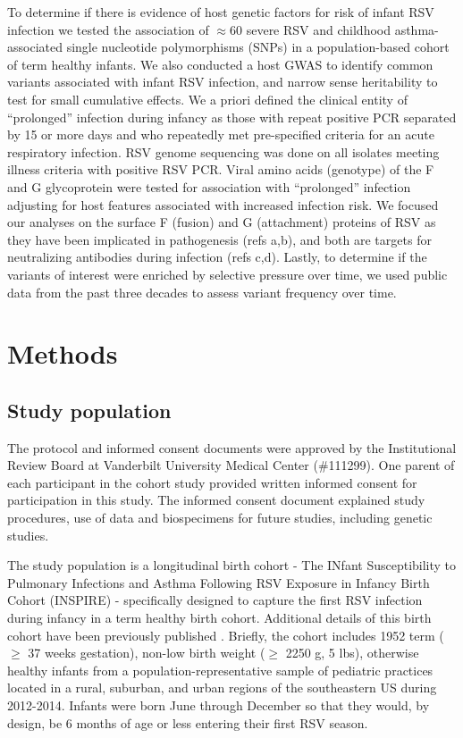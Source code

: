 \documentclass{article} %
\begin{document}
To determine if there is evidence of host genetic factors for risk of infant RSV infection we tested the association of $\approx 60$ severe RSV and childhood asthma-associated single nucleotide polymorphisms (SNPs) in a population-based cohort of term healthy infants.
 We also conducted a host GWAS to identify common variants associated with infant RSV infection, and narrow sense heritability to test for small cumulative effects. 
We a priori defined the clinical entity of ``prolonged'' infection during infancy as those with repeat positive PCR separated by 15 or more days and who repeatedly met pre-specified criteria for an acute respiratory infection. 
RSV genome sequencing was done on all isolates meeting illness criteria with positive RSV PCR. 
Viral amino acids (genotype) of the F and G glycoprotein were tested for association with ``prolonged'' infection adjusting for host features associated with increased infection risk. 
We focused our analyses on the surface F (fusion) and G (attachment) proteins of RSV as they have been implicated in pathogenesis (refs a,b), and both are targets for neutralizing antibodies during infection (refs c,d).
Lastly, to determine if the variants of interest were enriched by selective pressure over time, we used public data from the past three decades to assess variant frequency over time.

\section{Methods}
\subsection{Study population}
The protocol and informed consent documents were approved by the Institutional Review Board at Vanderbilt University Medical Center (\#111299).  
One parent of each participant in the cohort study provided written informed consent for participation in this study. 
The informed consent document explained study procedures, use of data and biospecimens for future studies, including genetic studies.

The study population is a longitudinal birth cohort - The INfant Susceptibility to Pulmonary Infections and Asthma Following RSV Exposure in Infancy Birth Cohort (INSPIRE) - specifically designed to capture the first RSV infection during infancy in a term healthy birth cohort. 
Additional details of this birth cohort have been previously published 
\cite{larkin_objectives_2015}.
Briefly, the cohort includes 1952 term ($\ge$ 37 weeks gestation), non-low birth weight ($\ge$ 2250 g, 5 lbs), otherwise healthy infants from a population-representative sample of pediatric practices located in a rural, suburban, and urban regions of the southeastern US during 2012-2014. 
Infants were born June through December so that they would, by design, be 6 months of age or less entering their first RSV season. 
\end{document}
